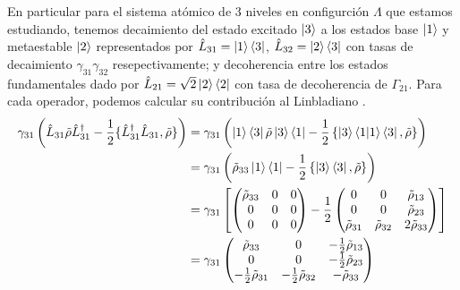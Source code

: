 En particular para el sistema atómico de 3 niveles en configurción $\Lambda$ que estamos estudiando, tenemos decaimiento del estado excitado $\ket{3}$ a los estados base $\ket{1}$ y metaestable $\ket{2}$ representados por $\hat{L}_{31} = \ket{1} \bra{3}$, $\hat{L}_{32} = \ket{2} \bra{3}$ con tasas de decaimiento $\gamma_{31} \gamma_{32}$ resepectivamente; y decoherencia entre los estados fundamentales dado por $\hat{L}_{21} = \sqrt{2} \ket{2} \bra{2}$ con tasa de decoherencia de $\Gamma_{21}$. Para cada operador, podemos calcular su contribución al Linbladiano \cite{scullyQuantumOptics1997a,fleischhauerElectromagneticallyInducedTransparency2005}. 
\begin{equation}
\begin{split}
    \gamma_{31} \left( \hat{L}_{31} \tilde{\rho} \hat{L}_{31}^{\dagger} - \frac{1}{2} \{\hat{L}_{31}^{\dagger} \hat{L}_{31}, \tilde{\rho}\} \right) &= \gamma_{31} \left(\ket{1}\bra{3}\tilde{\rho} \ket{3} \bra{1} - \frac{1}{2}  \left\{\ket{3} \bra{1}\ket{1}\bra{3} , \tilde{\rho}\right\} \right) \\
    &= \gamma_{31} \left(\tilde{\rho}_{33} \ket{1}\bra{1} - \frac{1}{2}  \left\{\ket{3}\bra{3},\tilde{\rho}\right\} \right) \\
    &= \gamma_{31} \left[ \begin{pmatrix}
        \tilde{\rho}_{33} & 0 &  0\\
        0 & 0 & 0 \\
        0 & 0 & 0 \\
    \end{pmatrix}
    - \frac{1}{2} \begin{pmatrix}
        0 & 0 & \tilde{\rho}_{13} \\
        0 & 0 & \tilde{\rho}_{23} \\
        \tilde{\rho}_{31} & \tilde{\rho}_{32} & 2 \tilde{\rho}_{33} \\
    \end{pmatrix} \right] \\
    &= \gamma_{31} \begin{pmatrix}
     \tilde{\rho}_{33} & 0 &  - \frac{1}{2} \tilde{\rho}_{13} \\
        0 & 0 &  - \frac{1}{2} \tilde{\rho}_{23} \\
         - \frac{1}{2}  \tilde{\rho}_{31} &   - \frac{1}{2} \tilde{\rho}_{32} &  - \tilde{\rho}_{33} \\
    \end{pmatrix} 
\end{split}
\end{equation}
